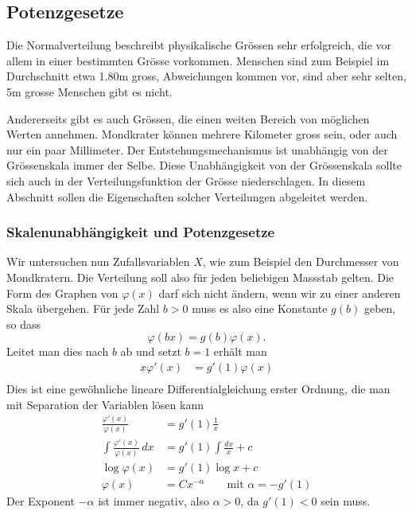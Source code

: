 %
%
%
\subsection{Potenzgesetze} \label{potenzgesetze}
%
Die Normalverteilung beschreibt physikalische Grössen sehr erfolgreich,
die vor allem in einer bestimmten Grösse vorkommen.
Menschen sind zum
Beispiel im Durchschnitt etwa 1.80m gross, Abweichungen kommen vor, sind
aber sehr selten, 5m grosse Menschen gibt es nicht.


Andererseits gibt es auch Grössen, die einen weiten Bereich von möglichen
Werten annehmen.
Mondkrater können mehrere Kilometer gross sein, oder auch
nur ein paar Millimeter.
Der Entstehungsmechanismus ist unabhängig von der
Grössenskala immer der Selbe.
Diese Unabhängigkeit von der Grössenskala
sollte sich auch in der Verteilungsfunktion der Grösse niederschlagen.
In diesem Abschnitt sollen die Eigenschaften solcher Verteilungen abgeleitet
werden.

\subsubsection{Skalenunabhängigkeit und Potenzgesetze}
Wir untersuchen nun Zufallsvariablen $X$, wie zum Beispiel den Durchmesser
von Mondkratern. 
Die Verteilung soll also für jeden beliebigen
Mass\-stab gelten.
Die Form des Graphen von $\varphi(x)$ darf sich nicht ändern,
wenn wir zu einer anderen Skala übergehen.
Für jede Zahl $b>0$ muss es also eine Konstante $g(b)$ geben, 
so dass
\[
\varphi(bx)=g(b)\varphi(x).
\]
Leitet man dies nach $b$ ab und setzt $b=1$ erhält man
\begin{align*}
x\varphi'(x)&=g'(1)\varphi(x)\\
\end{align*}
Dies ist eine gewöhnliche lineare Differentialgleichung
erster Ordnung, die man mit Separation der Variablen
lösen kann
\begin{align*}
\frac{\varphi'(x)}{\varphi(x)}&=g'(1)\frac1x
\\
\int\frac{\varphi'(x)}{\varphi(x)}\,dx&=g'(1)\int\frac{dx}x + c
\\
\log \varphi(x)&=g'(1)\log x+c
\\
\varphi(x)&=Cx^{-\alpha}\qquad\text{mit $\alpha=-g'(1)$}
\end{align*}
Der Exponent $-\alpha$ ist immer negativ, also $\alpha > 0$,
da $g'(1)<0$ sein muss.

